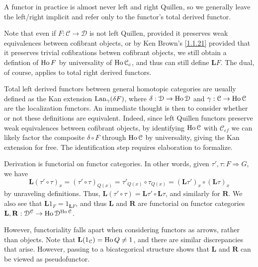 \begin{terminology}\label{3.2.2}
	A functor in practice is almost never left and right Quillen, so we generally leave the left/right implicit and refer only to the functor's total derived functor.
\end{terminology}

\begin{remark}\label{3.2.3}
	Note that even if $F : \mathcal{C}  \to \mathcal{D} $ is not left Quillen, provided it preserves weak equivalences between cofibrant objects, or by Ken Brown's \cref{1.1.21} provided that it preserves trivial cofibrations betwen cofibrant objects, we still obtain a defintion of $\operatorname{Ho} F$ by universality of $\operatorname{Ho} \mathcal{C} _c$, and thus can still define $\mathbf{L} F$. The dual, of course, applies to total right derived functors.
\end{remark}

\begin{remark}\label{3.2.4}
	Total left derived functors between general homotopic categories are usually defined as the Kan extension $\operatorname{Lan}_\gamma (\delta F)$, where $\delta : \mathcal{D}  \to \operatorname{Ho} \mathcal{D} $ and $\gamma : \mathcal{C}  \to \operatorname{Ho} \mathcal{C} $ are the localization functors. An immediate thought is then to consider whether or not these definitions are equivalent. Indeed, since left Quillen functors preserve weak equivalences between cofibrant objects, by identifying $\operatorname{Ho} \mathcal{C} $ with $\mathcal{C} _{cf} $ we can likely factor the composite $\delta \circ F$ through $\operatorname{Ho} \mathcal{C} $ by universality, giving the Kan extension for free. The identification step requires elaboration to formalize.
\end{remark}

\begin{remark}\label{3.2.5}
	Derivation is functorial on functor categories. In other words, given $\tau',\tau : F \Rightarrow G$, we have
	\[
		\mathbf{L} (\tau'\circ \tau)_x=(\tau'\circ \tau)_{Q(x)} =\tau'_{Q(x)} \circ \tau_{Q(x)} =(\mathbf{L} \tau')_x\circ (\mathbf{L} \tau)_x
	\]
	by unraveling definitions. Thus, $\mathbf{L} (\tau'\circ \tau)=\mathbf{L} \tau' \circ \mathbf{L} \tau$, and similarly for $\mathbf{R} $. We also see that $\mathbf{L}1_{F} =1_{\mathbf{L} F} $, and thus $\mathbf{L} $ and $\mathbf{R} $ are functorial on functor categories $\mathbf{L} ,\mathbf{R} :\mathcal{D} ^\mathcal{C} \to \operatorname{Ho} \mathcal{D} ^{\operatorname{Ho} \mathcal{C} } $.

	However, functoriality falls apart when considering functors as arrows, rather than objects. Note that $\mathbf{L} (1_\mathcal{C} )=\operatorname{Ho} Q\neq 1$, and there are similar discrepancies that arise. However, passing to a bicategorical structure shows that $\mathbf{L} $ and $\mathbf{R} $ can be viewed as pseudofunctor.
\end{remark}

